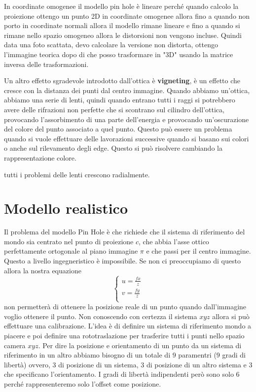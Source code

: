 \begin{nota}
    In coordinate omogenee il modello pin hole è lineare perché quando calcolo 
    la proiezione ottengo un punto 2D in coordinate omogenee allora fino a quando 
    non porto in coordinate normali allora il modello rimane lineare e fino a quando 
    si rimane nello spazio omogeneo allora le distorsioni non vengono incluse.
    Quindi data una foto scattata, devo calcolare la versione non distorta, ottengo 
    l'immagine teorica dopo di che posso trasformare in "3D" usando la matrice inversa 
    delle trasformazioni.
\end{nota}

Un altro effetto sgradevole introdotto dall'ottica è \textbf{vigneting}, è un 
effetto che cresce con la distanza dei punti dal centro immagine. Quando abbiamo 
un'ottica, abbiamo una serie di lenti, quindi quando entrano tutti i raggi si potrebbero 
avere delle rifrazioni non perfette che si scontrano sul cilindro dell'ottica,
provocando l'assorbimento di una parte dell'energia e provocando un'oscurazione del
colore del punto associato a quel punto. Questo può essere un problema quando si 
vuole effettuare delle lavorazioni successive quando si basano sui colori o anche 
sul rilevamento degli edge. Questo si può risolvere cambiando la rappresentazione 
colore.

\begin{nota}
    tutti i problemi delle lenti crescono radialmente.
\end{nota}

\section{Modello realistico}
Il problema del modello Pin Hole è che richiede che il sistema di riferimento del 
mondo sia centrato nel punto di proiezione $c$, che abbia l'asse ottico perfettamente
ortogonale al piano immagine $\pi$ e che passi per il centro immagine. Questo a 
livello ingegneristico è impossibile. Se non ci preoccupiamo di questo allora 
la nostra equazione 
$$\begin{cases}
    u= \frac{fx}{z}\\
    v= \frac{fy}{z}\\
\end{cases}$$
non permetterà di ottenere la posizione reale di un punto quando dall'immagine voglio
ottenere il punto. Non conoscendo con certezza il sistema $xyz$ allora si può 
effettuare una calibrazione. L'idea è di definire un sistema di riferimento mondo 
a piacere e poi definire una rototraslazione per trasferire tutti i punti nello 
spazio camera $xyz$. Per dire la posizione e orientamento di un punto da un sistema di riferimento 
in un altro abbiamo bisogno di un totale di $9$ paramentri ($9$ gradi di libertà)
ovvero, $3$ di posizione di un sistema, $3$ di posizione di un altro sistema 
e $3$ che specificano l'orientamento. I gradi di libertà indipendenti però sono solo 
$6$ perché rappresenteremo solo l'offset come posizione.

